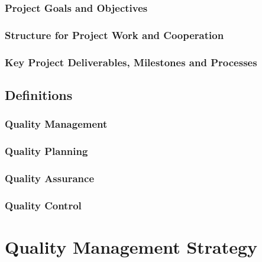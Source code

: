 \documentclass[
  11pt,
]{article}
\begin{document}
\hypertarget{project-goals-and-objectives}{%
\subsubsection{Project Goals and
Objectives}\label{project-goals-and-objectives}}

\hypertarget{structure-for-project-work-and-cooperation}{%
\subsubsection{Structure for Project Work and
Cooperation}\label{structure-for-project-work-and-cooperation}}

\hypertarget{key-project-deliverables-milestones-and-processes}{%
\subsubsection{Key Project Deliverables, Milestones and
Processes}\label{key-project-deliverables-milestones-and-processes}}

\hypertarget{definitions}{%
\subsection{Definitions}\label{definitions}}

\hypertarget{quality-management}{%
\subsubsection{Quality Management}\label{quality-management}}

\hypertarget{quality-planning}{%
\subsubsection{Quality Planning}\label{quality-planning}}

\hypertarget{quality-assurance}{%
\subsubsection{Quality Assurance}\label{quality-assurance}}

\hypertarget{quality-control}{%
\subsubsection{Quality Control}\label{quality-control}}

\clearpage

\hypertarget{quality-management-strategy}{%
\section{Quality Management
Strategy}\label{quality-management-strategy}}
\end{document}
